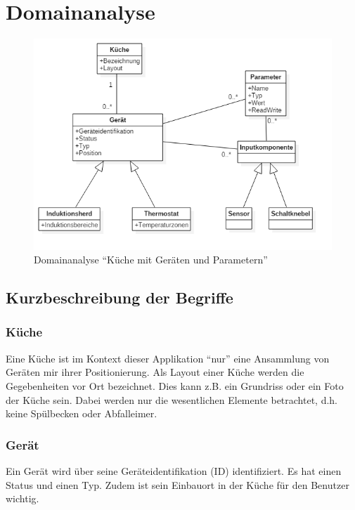 
\section{Domainanalyse}
\label{sec:Domainanalyse}

\begin{figure}[H]
	\includegraphics[scale=0.6]{analysis/res/Domain}
	\caption{Domainanalyse \enquote{Küche mit Geräten und Parametern}}
\end{figure}


\subsection{Kurzbeschreibung der Begriffe}
\label{subsec:Kurzbeschreibung der Begriffe}

\subsubsection{Küche}
\label{subsubsec:Küche}
Eine Küche ist im Kontext dieser Applikation \enquote{nur} eine Ansammlung von Geräten mir ihrer Positionierung. Als Layout einer Küche werden die Gegebenheiten vor Ort bezeichnet. Dies kann z.B. ein Grundriss oder ein Foto der Küche sein. Dabei werden nur die wesentlichen Elemente betrachtet, d.h. keine Spülbecken oder Abfalleimer.

\subsubsection{Gerät}
\label{subsubsec:Gerät}
Ein Gerät wird über seine Geräteidentifikation (ID) identifiziert. Es hat einen Status und einen Typ. Zudem ist sein Einbauort in der Küche für den Benutzer wichtig.


